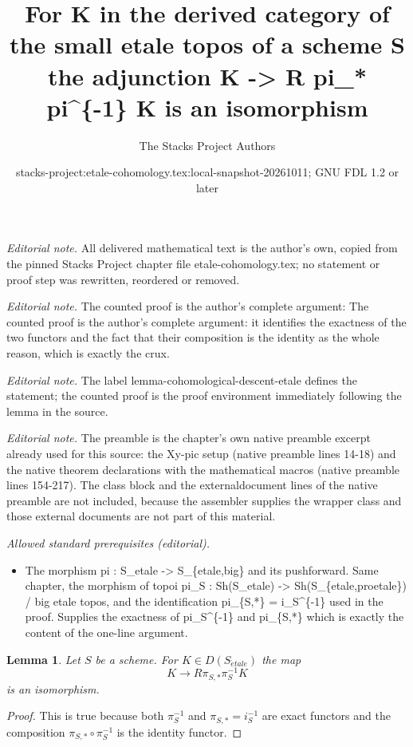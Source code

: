 \documentclass[10pt,a4paper]{amsart}
\title{For K in the derived category of the small etale topos of a scheme S the adjunction K -> R pi\_* pi\textasciicircum{}\{-1\} K is an isomorphism}
\author{The Stacks Project Authors}
\date{stacks-project:etale-cohomology.tex:local-snapshot-20261011; GNU FDL 1.2 or later}
\theoremstyle{plain}
\newtheorem{lemma}[subsection]{Lemma}
\theoremstyle{definition}
\theoremstyle{remark}
\numberwithin{equation}{subsection}
\def\etale{{\acute{e}tale}}
\begin{document}
\maketitle
\noindent\textit{Editorial note.} All delivered mathematical text is the author's own, copied from the pinned Stacks Project chapter file etale-cohomology.tex; no statement or proof step was rewritten, reordered or removed.\par\medskip
\noindent\textit{Editorial note.} The counted proof is the author's complete argument: The counted proof is the author's complete argument: it identifies the exactness of the two functors and the fact that their composition is the identity as the whole reason, which is exactly the crux.\par\medskip
\noindent\textit{Editorial note.} The label lemma-cohomological-descent-etale defines the statement; the counted proof is the proof environment immediately following the lemma in the source.\par\medskip
\noindent\textit{Editorial note.} The preamble is the chapter's own native preamble excerpt already used for this source: the Xy-pic setup (native preamble lines 14-18) and the native theorem declarations with the mathematical macros (native preamble lines 154-217). The class block and the externaldocument lines of the native preamble are not included, because the assembler supplies the wrapper class and those external documents are not part of this material.\par\medskip
\noindent\textit{Allowed standard prerequisites (editorial).}\begin{itemize}
\item The morphism pi : S\_etale -> S\_\{etale,big\} and its pushforward. Same chapter, the morphism of topoi pi\_S : Sh(S\_etale) -> Sh(S\_\{etale,proetale\}) / big etale topos, and the identification pi\_\{S,*\} = i\_S\textasciicircum{}\{-1\} used in the proof. Supplies the exactness of pi\_S\textasciicircum{}\{-1\} and pi\_\{S,*\} which is exactly the content of the one-line argument.
\end{itemize}\medskip
\begin{lemma}
\label{lemma-cohomological-descent-etale}
Let $S$ be a scheme. For $K \in D(S_\etale)$ the map
$$
K \longrightarrow R\pi_{S, *}\pi_S^{-1}K
$$
is an isomorphism.
\end{lemma}

\begin{proof}
This is true because both $\pi_S^{-1}$ and $\pi_{S, *} = i_S^{-1}$
are exact functors and the composition $\pi_{S, *} \circ \pi_S^{-1}$
is the identity functor.
\end{proof}
\end{document}
